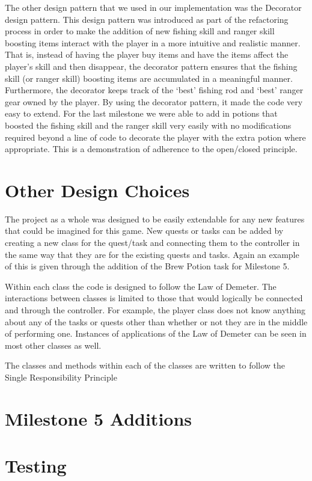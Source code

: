 \documentclass[letter paper, 12pt]{article}
\begin{document}
The other design pattern that we used in our implementation was the Decorator design pattern. This design pattern was introduced as part of the refactoring process in order to make the addition of new fishing skill and ranger skill boosting items interact with the player in a more intuitive and realistic manner. That is, instead of having the player buy items and have the items affect the player's skill and then disappear, the decorator pattern ensures that the fishing skill (or ranger skill) boosting items are accumulated in a meaningful manner. Furthermore, the decorator keeps track of the `best' fishing rod and `best' ranger gear owned by the player. By using the decorator pattern, it made the code very easy to extend. For the last milestone we were able to add in potions that boosted the fishing skill and the ranger skill very easily with no modifications required beyond a line of code to decorate the player with the extra potion where appropriate. This is a demonstration of adherence to the open/closed principle.

\section{Other Design Choices}\label{sec:other}
The project as a whole was designed to be easily extendable for any new features that could be imagined for this game. New quests or tasks can be added by creating a new class for the quest/task and connecting them to the controller in the same way that they are for the existing quests and tasks. Again an example of this is given through the addition of the Brew Potion task for Milestone 5.

Within each class the code is designed to follow the Law of Demeter. The interactions between classes is limited to those that would logically be connected and through the controller. For example, the player class does not know anything about any of the tasks or quests other than whether or not they are in the middle of performing one. Instances of applications of the Law of Demeter can be seen in most other classes as well. 

The classes and methods within each of the classes are written to follow the Single Responsibility Principle 



\section{Milestone 5 Additions}\label{sec:milestone}


\section{Testing}\label{sec:testing}
\end{document}
